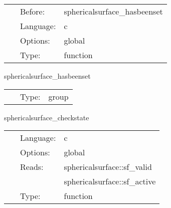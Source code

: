 \hspace{5mm}{\it set surface radii } 


\hspace{5mm}

 \begin{tabular*}{160mm}{cll} 
~ & Before:  & sphericalsurface\_hasbeenset \\ 
~ & Language:  & c \\ 
~ & Options:  & global \\ 
~ & Type:  & function \\ 
\end{tabular*} 


\vspace{5mm}


\hspace{5mm} sphericalsurface\_hasbeenset 

\hspace{5mm}{\it set the spherical surfaces before this group, and use it afterwards } 


\hspace{5mm}

 \begin{tabular*}{160mm}{cll} 
~ & Type:  & group \\ 
\end{tabular*} 


\vspace{5mm}


\hspace{5mm} sphericalsurface\_checkstate 

\hspace{5mm}{\it test the state of the spherical surfaces } 


\hspace{5mm}

 \begin{tabular*}{160mm}{cll} 
~ & Language:  & c \\ 
~ & Options:  & global \\ 
~ & Reads:  & sphericalsurface::sf\_valid \\ 
~& ~ &sphericalsurface::sf\_active\\ 
~ & Type:  & function \\ 
\end{tabular*} 


\vspace{5mm}

